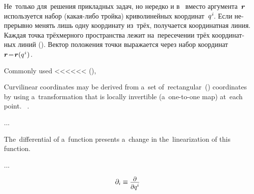 \begin{otherlanguage}{russian}

Не~только для~решения прикладных задач, но нередко и в~ вместо аргумента~$\bm{r}$ ис\-поль\-зу\-ет\-ся набор (какая-либо трой\-ка) криво\-линей\-ных координат~${q^{\hspace{.1ex}i}\hspace{-0.2ex}}$.
Если непрерывно менять лишь одну координату из~трёх, получается координатная линия.
Каждая точка трёхмерного пространства лежит на~пересечении трёх координатных линий ().
Вектор положения точки выражается через набор координат   ${\bm{r} \hspace{-0.4ex} = \hspace{-0.4ex} \bm{r}(q^{\hspace{.1ex}i}\hspace{.1ex})}$.

\end{otherlanguage}

Commonly used <<<<<<
 (),   \ru{\:---}

Curvilinear coordinates may be derived from a~set of~rectangular~() coordinates by using a~transformation that is locally invertible (a~one-to-one map) at~each point.
       ~.

...

The~differential of a~function presents a~change in the~linearization of this function.

...


\nopagebreak\vspace{-0.4em}\begin{equation*}
\partial_i \equiv \scalebox{0.9}{$ \displaystyle\frac{\raisebox{-0.2em}{$\partial$}}{\raisebox{-0.1em}{$\partial q^i$}} $}
\end{equation*}

